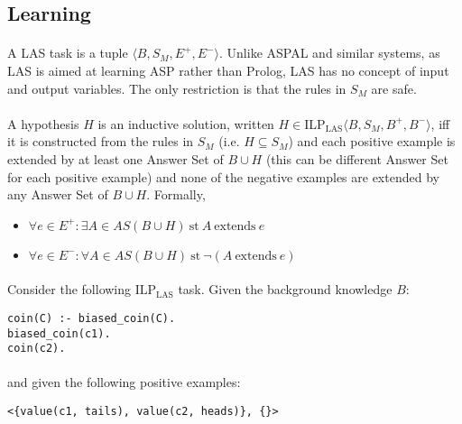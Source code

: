 \documentclass{article}
\theoremstyle{plain}
\theoremstyle{definition}
\begin{document}
\begin{multicols}{2}
\subsection{Learning}

\paragraph{} A LAS task is a tuple $\langle B, S_M, E^+, E^- \rangle$. Unlike ASPAL and similar systems, as LAS is aimed at learning ASP rather than Prolog, LAS has no concept of input and output variables. The only restriction is that the rules in $S_M$ are safe. 

\paragraph{} A hypothesis $H$ is an inductive solution, written $H \in \text{ILP}_\text{LAS}\langle B, S_M, B^+, B^- \rangle$, iff it is constructed from the rules in $S_M$ (i.e. $H \subseteq S_M$) and each positive example is extended by at least one Answer Set of $B \cup H$ (this can be different Answer Set for each positive example) and none of the negative examples are extended by any Answer Set of $B \cup H$. Formally,

\begin{itemize}
\item $\forall e \in E^+: \exists A \in AS(B \cup H)\ \text{st}\ A\ \text{extends}\ e$
\item $\forall e \in E^-: \forall A \in AS(B \cup H)\ \text{st}\ \lnot(A\ \text{extends}\ e)$
\end{itemize}

\paragraph{} Consider the following $\text{ILP}_\text{LAS}$ task. Given the background knowledge $B$:

\begin{lstlisting}
coin(C) :- biased_coin(C).
biased_coin(c1).
coin(c2).
\end{lstlisting}

\paragraph{} and given the following positive examples:

\begin{lstlisting}
<{value(c1, tails), value(c2, heads)}, {}>
\end{lstlisting}


\end{multicols}
\end{document}
